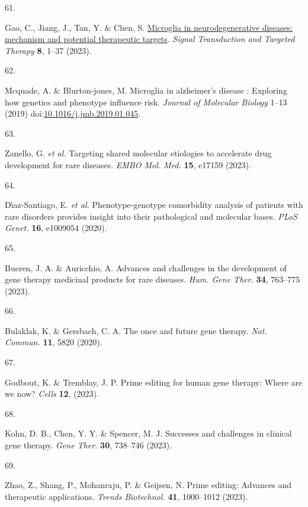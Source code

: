 \documentclass[
]{article}
\newlength{\cslhangindent}
\newlength{\csllabelwidth}
\newenvironment{CSLReferences}[2] %
 {\begin{list}{}{%
  \setlength{\itemindent}{0pt}
  \setlength{\leftmargin}{0pt}
  \setlength{\parsep}{0pt}
  \ifodd #1
   \setlength{\leftmargin}{\cslhangindent}
   \setlength{\itemindent}{-1\cslhangindent}
  \fi
  \setlength{\itemsep}{#2\baselineskip}}}
 {\end{list}}
\newcommand{\CSLLeftMargin}[1]{\parbox[t]{\csllabelwidth}{\strut#1\strut}}
\newcommand{\CSLRightInline}[1]{\parbox[t]{\linewidth - \csllabelwidth}{\strut#1\strut}}
\begin{document}
\begin{CSLReferences}{0}{0}
\CSLLeftMargin{61. }%
\CSLRightInline{Gao, C., Jiang, J., Tan, Y. \& Chen, S.
\href{https://doi.org/10.1038/s41392-023-01588-0}{Microglia in
neurodegenerative diseases: mechanism and potential therapeutic
targets}. \emph{Signal Transduction and Targeted Therapy} \textbf{8},
1--37 (2023).}

\CSLLeftMargin{62. }%
\CSLRightInline{Mcquade, A. \& Blurton-jones, M. Microglia in
alzheimer's disease : Exploring how genetics and phenotype influence
risk. \emph{Journal of Molecular Biology} 1--13 (2019)
doi:\href{https://doi.org/10.1016/j.jmb.2019.01.045}{10.1016/j.jmb.2019.01.045}.}

\CSLLeftMargin{63. }%
\CSLRightInline{Zanello, G. \emph{et al.} Targeting shared molecular
etiologies to accelerate drug development for rare diseases. \emph{EMBO
Mol. Med.} \textbf{15}, e17159 (2023).}

\CSLLeftMargin{64. }%
\CSLRightInline{Dı́az-Santiago, E. \emph{et al.} Phenotype-genotype
comorbidity analysis of patients with rare disorders provides insight
into their pathological and molecular bases. \emph{PLoS Genet.}
\textbf{16}, e1009054 (2020).}

\CSLLeftMargin{65. }%
\CSLRightInline{Bueren, J. A. \& Auricchio, A. Advances and challenges
in the development of gene therapy medicinal products for rare diseases.
\emph{Hum. Gene Ther.} \textbf{34}, 763--775 (2023).}

\CSLLeftMargin{66. }%
\CSLRightInline{Bulaklak, K. \& Gersbach, C. A. The once and future gene
therapy. \emph{Nat. Commun.} \textbf{11}, 5820 (2020).}

\CSLLeftMargin{67. }%
\CSLRightInline{Godbout, K. \& Tremblay, J. P. Prime editing for human
gene therapy: Where are we now? \emph{Cells} \textbf{12}, (2023).}

\CSLLeftMargin{68. }%
\CSLRightInline{Kohn, D. B., Chen, Y. Y. \& Spencer, M. J. Successes and
challenges in clinical gene therapy. \emph{Gene Ther.} \textbf{30},
738--746 (2023).}

\CSLLeftMargin{69. }%
\CSLRightInline{Zhao, Z., Shang, P., Mohanraju, P. \& Geijsen, N. Prime
editing: Advances and therapeutic applications. \emph{Trends
Biotechnol.} \textbf{41}, 1000--1012 (2023).}


\end{CSLReferences}
\end{document}
